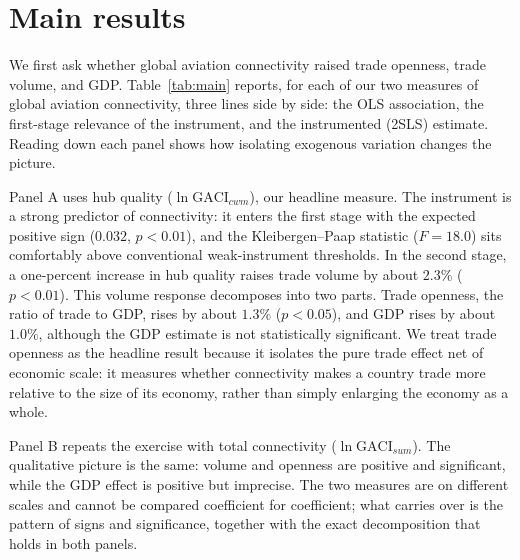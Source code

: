 \section{Main results}

We first ask whether global aviation connectivity raised trade openness, trade
volume, and GDP. Table~\ref{tab:main} reports, for each of our two measures of
global aviation connectivity, three lines side by side: the OLS association, the
first-stage relevance of the instrument, and the instrumented (2SLS) estimate.
Reading down each panel shows how isolating exogenous variation changes the
picture.

Panel A uses hub quality ($\ln\mathrm{GACI}_{cwm}$), our headline measure. The
instrument is a strong predictor of connectivity: it enters the first stage with
the expected positive sign ($0.032$, $p<0.01$), and the Kleibergen--Paap
statistic ($F=18.0$) sits comfortably above conventional weak-instrument
thresholds. In the second stage, a one-percent increase in hub quality raises
trade volume by about $2.3\%$ ($p<0.01$). This volume response decomposes into two
parts. Trade openness, the ratio of trade to GDP, rises by about $1.3\%$
($p<0.05$), and GDP rises by about $1.0\%$, although the GDP estimate is not
statistically significant. We treat trade openness as the headline result because
it isolates the pure trade effect net of economic scale: it measures whether
connectivity makes a country trade more relative to the size of its economy,
rather than simply enlarging the economy as a whole.

Panel B repeats the exercise with total connectivity ($\ln\mathrm{GACI}_{sum}$).
The qualitative picture is the same: volume and openness are positive and
significant, while the GDP effect is positive but imprecise. The two measures are
on different scales and cannot be compared coefficient for coefficient; what
carries over is the pattern of signs and significance, together with the exact
decomposition that holds in both panels.

